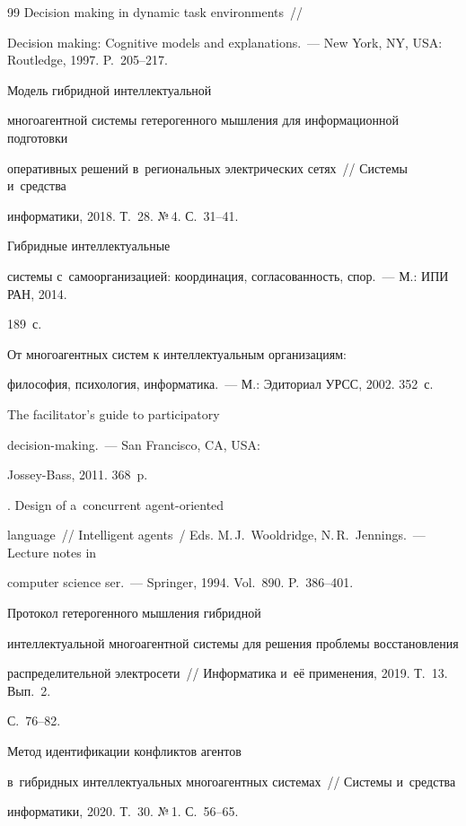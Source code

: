 {{\begin{thebibliography}{99}
   Decision making in dynamic task environments~/\!\!/ 


Decision making: Cognitive models and explanations.~--- New York, NY, USA: Routledge, 1997. P.~205--217.




   Модель гибридной интеллектуальной 


многоагентной системы гетерогенного мышления для информационной подготовки 


оперативных решений в~региональных электрических сетях~/\!\!/ Системы и~средства 


информатики, 2018. Т.~28. №\,4. С.~31--41.




   Гибридные интеллектуальные 


системы с~самоорганизацией: координация, согласованность, спор.~--- М.: ИПИ РАН, 2014. 


189~с.




   От многоагентных систем к интеллектуальным организациям: 


философия, психология, информатика.~--- М.: Эдиториал УРСС, 2002. 352~с.




   The facilitator's guide to participatory 


  decision-making.~--- San Francisco, CA, USA:  


Jossey-Bass, 2011. 368~p.




  . Design of a~concurrent agent-oriented 


language~/\!\!/ Intelligent agents~/ Eds. M.\,J.~Wooldridge,  N.\,R.~Jennings.~---  Lecture notes in 


computer science ser.~--- Springer, 1994. Vol.~890. P.~386--401.




   Протокол гетерогенного мышления гибридной 


интеллектуальной многоагентной системы для решения проблемы восстановления 


распределительной электросети~/\!\!/ Информатика и~её применения, 2019. Т.~13. Вып.~2. 


С.~76--82.




   Метод идентификации конфликтов агентов 


  в~гибридных интеллектуальных многоагентных системах~/\!\!/ Системы и~средства 


информатики, 2020. Т.~30. №\,1. С.~56--65.


   \end{thebibliography}


   } }


